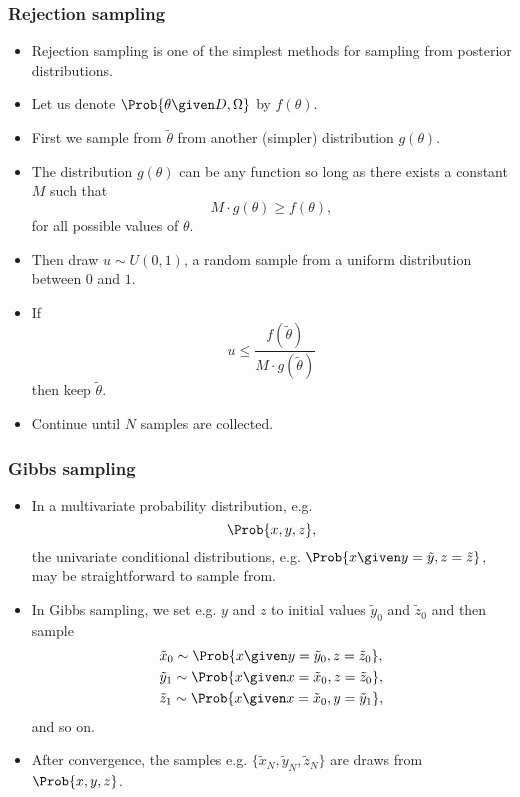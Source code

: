 \documentclass{slides}
\begin{document}
\begin{frame}
	\frametitle{Rejection sampling}
	\begin{itemize}
		\item Rejection sampling is one of the simplest methods for sampling from posterior distributions.
		\item Let us denote $\Prob{\theta\given D, \Omega}$ by $f(\theta)$.
		\item First we sample from $\tilde{\theta}$ from another (simpler) distribution $g(\theta)$.
		\item The distribution $g(\theta)$ can be any function so long as there exists a constant $M$ such that 
			\[ M \cdot g(\theta) \geq f(\theta),\]
			for all possible values of $\theta$.
		\item Then draw $u \sim U(0, 1)$, a random sample from a uniform distribution between $0$ and $1$.
		\item If\[ u \leq \frac{f(\tilde{\theta})}{M \cdot g(\tilde{\theta})}\]
			then keep $\tilde{\theta}$. 
		\item Continue until $N$ samples are collected.

	\end{itemize}
\end{frame}

\begin{frame}
	\frametitle{Gibbs sampling}
	\begin{itemize}
		\item In a multivariate probability distribution, e.g. 
			\[\Prob{x, y, z},\]
			the univariate conditional distributions, e.g. $\Prob{x
			\given y=\tilde{y}, z=\tilde{z}}$, may be
			straightforward to sample from.
		\item In Gibbs sampling, we set e.g. $y$ and $z$ to initial values $\tilde{y}_0$ and $\tilde{z}_0$ and then sample
			\begin{align*}
				&\tilde{x}_0 \sim \Prob{x \given y=\tilde{y}_0, z=\tilde{z}_0},\\
				&\tilde{y}_1 \sim \Prob{x \given x=\tilde{x}_0, z=\tilde{z}_0},\\
				&\tilde{z}_1 \sim \Prob{x \given x=\tilde{x}_0, y=\tilde{y}_1},
			\end{align*}
		and so on.
	\item After convergence, the samples e.g. $\{\tilde{x}_N, \tilde{y}_N, \tilde{z}_N\}$ are draws from $\Prob{x, y, z}$.
	\end{itemize}
\end{frame}
\end{document}
